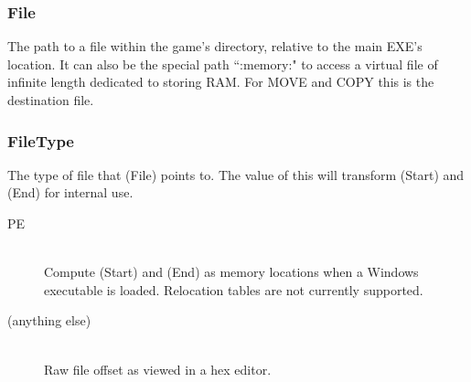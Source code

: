 \documentclass[12pt,a4paper,notitlepage]{article}
\begin{document}

\subsubsection{File}
The path to a file within the game's directory, relative to the main EXE's location. It can also be the special path ``:memory:" to access a virtual file of infinite length dedicated to storing RAM. For MOVE and COPY this is the destination file.

\subsubsection{FileType}
The type of file that (File) points to. The value of this will transform (Start) and (End) for internal use.

\begin{description}
\item[PE] \hfill \\ 
    Compute (Start) and (End) as memory locations when a Windows executable is loaded. Relocation tables are not currently supported.
\item[(anything else)] \hfill \\
    Raw file offset as viewed in a hex editor.
\end{description}
\end{document}
